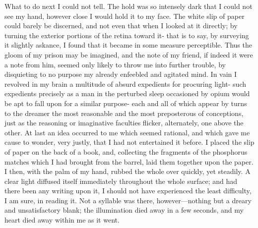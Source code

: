 What to do next I could not tell. The hold was so intensely dark that I could
not see my hand, however close I would hold it to my face. The white slip of
paper could barely be discerned, and not even that when I looked at it directly;
by turning the exterior portions of the retina toward it- that is to say, by
surveying it slightly askance, I found that it became in some measure
perceptible. Thus the gloom of my prison may be imagined, and the note of my
friend, if indeed it were a note from him, seemed only likely to throw me into
further trouble, by disquieting to no purpose my already enfeebled and agitated
mind. In vain I revolved in my brain a multitude of absurd expedients for
procuring light- such expedients precisely as a man in the perturbed sleep
occasioned by opium would be apt to fall upon for a similar purpose- each and
all of which appear by turns to the dreamer the most reasonable and the most
preposterous of conceptions, just as the reasoning or imaginative faculties
flicker, alternately, one above the other. At last an idea occurred to me which
seemed rational, and which gave me cause to wonder, very justly, that I had not
entertained it before. I placed the slip of paper on the back of a book, and,
collecting the fragments of the phosphorus matches which I had brought from the
barrel, laid them together upon the paper. I then, with the palm of my hand,
rubbed the whole over quickly, yet steadily. A clear light diffused itself
immediately throughout the whole surface; and had there been any writing upon
it, I should not have experienced the least difficulty, I am sure, in reading
it. Not a syllable was there, however---nothing but a dreary and unsatisfactory
blank; the illumination died away in a few seconds, and my heart died away
within me as it went. 

